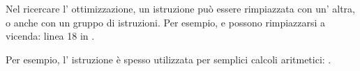 Nel ricercare l' ottimizzazione, un istruzione può essere rimpiazzata con un' altra, o anche con un gruppo di istruzioni.
Per esempio, \ADD e \SUB possono rimpiazzarsi a vicenda:
linea 18 in .

Per esempio, l' istruzione \LEA è spesso utilizzata per semplici calcoli aritmetici: .




